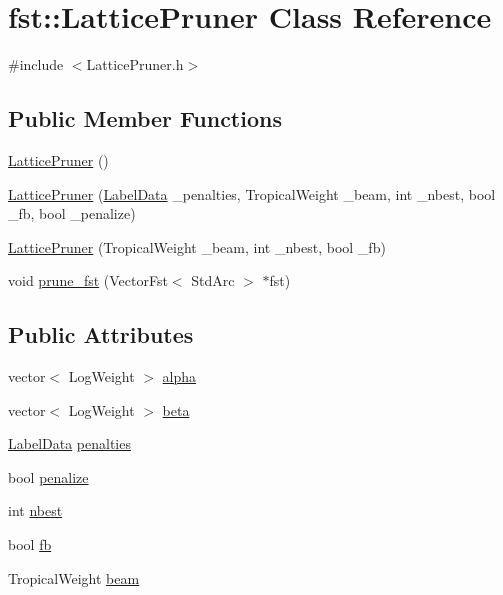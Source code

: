 \hypertarget{classfst_1_1_lattice_pruner}{}\section{fst\+:\+:Lattice\+Pruner Class Reference}
\label{classfst_1_1_lattice_pruner}


{\ttfamily \#include $<$Lattice\+Pruner.\+h$>$}

\subsection*{Public Member Functions}
\begin{DoxyCompactItemize}
\item 
\hyperlink{classfst_1_1_lattice_pruner_a8ecd3fdc53f0d48fb411b96014efe9ab}{Lattice\+Pruner} ()
\item 
\hyperlink{classfst_1_1_lattice_pruner_aa2336aaaa48746a2cfc7fc8146597576}{Lattice\+Pruner} (\hyperlink{util_8h_a13f45ccb6f1fc986fdd8d78d0edf5a16}{Label\+Data} \+\_\+penalties, Tropical\+Weight \+\_\+beam, int \+\_\+nbest, bool \+\_\+fb, bool \+\_\+penalize)
\item 
\hyperlink{classfst_1_1_lattice_pruner_aff99de66a7b398cd8bc00f6b26817ab7}{Lattice\+Pruner} (Tropical\+Weight \+\_\+beam, int \+\_\+nbest, bool \+\_\+fb)
\item 
void \hyperlink{classfst_1_1_lattice_pruner_abe86a9417f34681b6979cfab38f9cbb4}{prune\+\_\+fst} (Vector\+Fst$<$ Std\+Arc $>$ $\ast$fst)
\end{DoxyCompactItemize}
\subsection*{Public Attributes}
\begin{DoxyCompactItemize}
\item 
vector$<$ Log\+Weight $>$ \hyperlink{classfst_1_1_lattice_pruner_a6d15772df115fcd55910b6e6b3d4f28c}{alpha}
\item 
vector$<$ Log\+Weight $>$ \hyperlink{classfst_1_1_lattice_pruner_a13bcf628dbceba07d4a7c4a9a0651370}{beta}
\item 
\hyperlink{util_8h_a13f45ccb6f1fc986fdd8d78d0edf5a16}{Label\+Data} \hyperlink{classfst_1_1_lattice_pruner_a4d2c5ebcc9a88bbe7ebdb58523c0b01f}{penalties}
\item 
bool \hyperlink{classfst_1_1_lattice_pruner_a812ff9458a41f3a40e60454fefad9c1e}{penalize}
\item 
int \hyperlink{classfst_1_1_lattice_pruner_a8346ec4a44626618420c75c14fdb64f6}{nbest}
\item 
bool \hyperlink{classfst_1_1_lattice_pruner_a0334f1638ddf39db90c820f9921fb689}{fb}
\item 
Tropical\+Weight \hyperlink{classfst_1_1_lattice_pruner_abdf2a2d041bba147d7a7199fcafedd36}{beam}
\end{DoxyCompactItemize}


